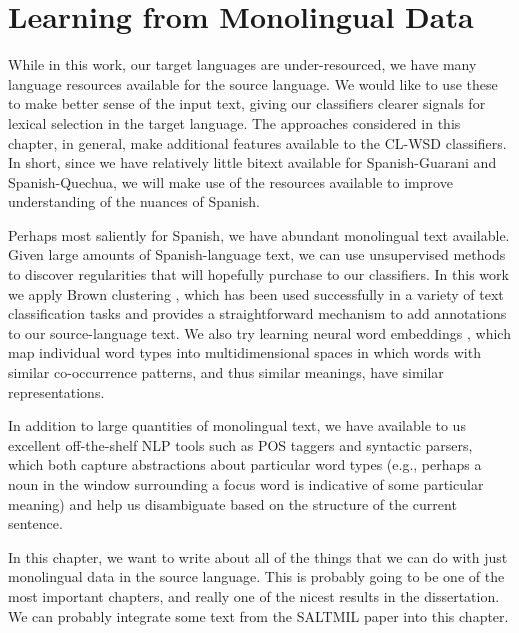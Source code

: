 \chapter{Learning from Monolingual Data}
\label{chap:monolingual}
While in this work, our target languages are under-resourced, we have many
language resources available for the source language. We would like to use
these to make better sense of the input text, giving our classifiers clearer
signals for lexical selection in the target language. The approaches considered
in this chapter, in general, make additional features available to the CL-WSD
classifiers. In short, since we have relatively little bitext available for
Spanish-Guarani and Spanish-Quechua, we will make use of the resources available
to improve understanding of the nuances of Spanish.

Perhaps most saliently for Spanish, we have abundant monolingual text available.
Given large amounts of Spanish-language text, we can use unsupervised methods to
discover regularities that will hopefully purchase to our classifiers.
In this work we apply Brown clustering
\cite{brown1992class}, which has been used successfully in a variety
of text classification tasks \cite{turian-ratinov-bengio:2010:ACL} and provides
a straightforward mechanism to add annotations to our source-language text.
We also try learning neural word embeddings \cite{mikolovword2vec}, which map
individual word types into multidimensional spaces in which words with similar
co-occurrence patterns, and thus similar meanings, have similar representations.


In addition to large quantities of monolingual text, we have available to us
excellent off-the-shelf NLP tools such as POS taggers and syntactic parsers,
which both capture abstractions about particular word types (e.g., perhaps a
noun in the window surrounding a focus word is indicative of some particular
meaning) and help us disambiguate based on the structure of the current
sentence.

In this chapter, we want to write about all of the things that we can do with
just monolingual data in the source language.
This is probably going to be one of the most important chapters, and really one
of the nicest results in the dissertation.
We can probably integrate some text from the SALTMIL paper into this chapter.


